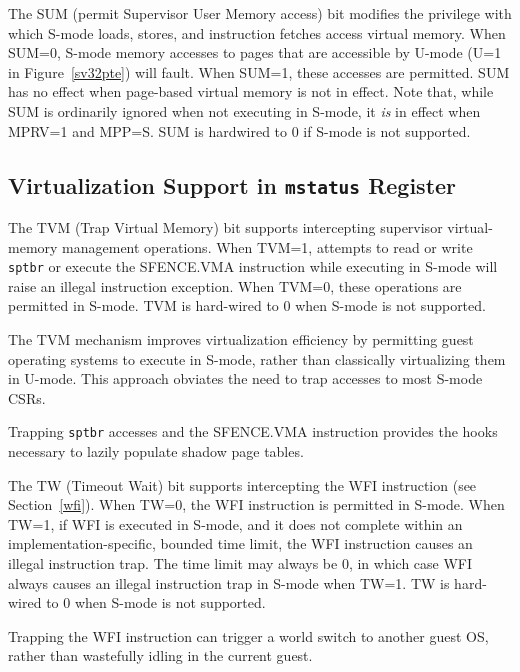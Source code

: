 The SUM (permit Supervisor User Memory access) bit modifies the privilege with
which S-mode loads, stores, and instruction fetches access virtual memory.
When SUM=0, S-mode memory accesses to pages that are accessible by U-mode (U=1
in Figure~\ref{sv32pte}) will fault.  When SUM=1, these accesses are
permitted.  SUM has no effect when page-based virtual memory is not in effect.
Note that, while SUM is ordinarily ignored when not executing in S-mode, it
{\em is} in effect when MPRV=1 and MPP=S.  SUM is hardwired to 0 if S-mode is
not supported.

\subsection{Virtualization Support in {\tt mstatus} Register}

The TVM (Trap Virtual Memory) bit supports intercepting
supervisor virtual-memory management operations.  When TVM=1,
attempts to read or write {\tt sptbr} or execute the SFENCE.VMA
instruction while executing in S-mode will raise an illegal instruction
exception.  When TVM=0, these operations are permitted in S-mode.
TVM is hard-wired to 0 when S-mode is not supported.

\begin{commentary}
The TVM mechanism improves virtualization efficiency by permitting guest
operating systems to execute in S-mode, rather than classically virtualizing
them in U-mode.  This approach obviates the need to trap accesses to most
S-mode CSRs.

Trapping {\tt sptbr} accesses and the SFENCE.VMA instruction provides the
hooks necessary to lazily populate shadow page tables.
\end{commentary}

The TW (Timeout Wait) bit supports intercepting the WFI instruction (see
Section~\ref{wfi}).  When TW=0, the WFI instruction is permitted in S-mode.
When TW=1, if WFI is executed in S-mode, and it does not complete within an
implementation-specific, bounded time limit, the WFI instruction causes an
illegal instruction trap.  The time limit may always be 0, in which case WFI
always causes an illegal instruction trap in S-mode when TW=1.
TW is hard-wired to 0 when S-mode is not supported.

\begin{commentary}
Trapping the WFI
instruction can trigger a world switch to another guest OS, rather than
wastefully idling in the current guest.
\end{commentary}

